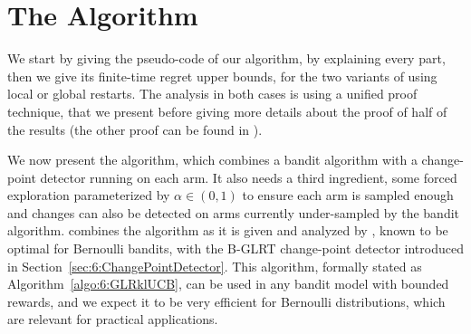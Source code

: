 \section{The \GLRklUCB{} Algorithm}
\label{sec:6:GLRklUCB_Algorithm}

We start by giving the pseudo-code of our algorithm, by explaining every part, then we give its finite-time regret upper bounds, for the two variants of using local or global restarts.
The analysis in both cases is using a unified proof technique, that we present before giving more details about the proof of half of the results (the other proof can be found in \cite{Besson2019GLRT}).



We now present the \GLRklUCB{} algorithm, which combines a bandit algorithm with a change-point detector running on each arm.
It also needs a third ingredient, some forced exploration parameterized by $\alpha\in(0,1)$ to ensure each arm is sampled enough and changes can also be detected on arms currently under-sampled by the bandit algorithm.
%
\GLRklUCB{} combines the \klUCB{} algorithm as it is given and analyzed by \cite{KLUCBJournal}, known to be optimal for Bernoulli bandits, with the B-GLRT change-point detector introduced in Section~\ref{sec:6:ChangePointDetector}.
%
This algorithm, formally stated as Algorithm~\ref{algo:6:GLRklUCB}, can be used in any bandit model with bounded rewards, and we expect it to be very efficient for Bernoulli distributions, which are relevant for practical applications.


